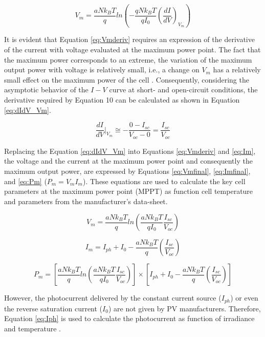 \begin{equation}
\label{eq:Vmderiv}
V_{m}=\dfrac{aNk_{B}T}{q} ln \left( -\dfrac{qNk_{B}T}{qI_{0}} \left( \dfrac{dI}{dV}  \right)_{V_{m}}   \right) 
\end{equation}

It is evident that Equation \ref{eq:Vmderiv} requires an expression of the derivative of the current with voltage evaluated at the maximum power point. The fact that the maximum power corresponds to an extreme, the variation of the maximum output power with voltage is relatively small, i.e., a change on $ V_{m} $ has a relatively small effect on the maximum power of the cell \cite{Saloux}. Consequently, considering the asymptotic behavior of the $I-V$ curve at short- and open-circuit conditions, the derivative required by Equation 10 can be calculated as shown in Equation \ref{eq:dIdV_Vm}.

\begin{equation}
\label{eq:dIdV_Vm}
\dfrac{dI}{dV}\vert_{V_{m}} \cong -\dfrac{0-I_{sc}}{V_{oc}-0}=\dfrac{I_{sc}}{V_{oc}}
\end{equation}

Replacing the Equation \ref{eq:dIdV_Vm} into Equations \ref{eq:Vmderiv} and \ref{eq:Im}, the voltage and the current at the maximum power point and consequently the maximum output power, are expressed by Equations \ref{eq:Vmfinal}, \ref{eq:Imfinal}, and \ref{eq:Pm} ($ P_{m}=V_{m}I_{m} $). These equations are used to calculate the key cell parameters at the maximum power point (MPPT) as function cell temperature and parameters from the manufacturer's data-sheet.

\begin{equation}
\label{eq:Vmfinal}
V_{m}=\dfrac{aNk_{B}T}{q} ln \left( \dfrac{aNk_{B}T}{qI_{0}} \dfrac{I_{sc}}{V_{oc}}  \right) 
\end{equation}

\begin{equation}
\label{eq:Imfinal}
I_{m} = I_{ph} + I_{0} - \dfrac{aNk_{B}T}{q} \left( \dfrac{I_{sc}}{V_{oc}} \right)  
\end{equation}

\begin{equation}
\label{eq:Pm}
P_{m} = \left[ \dfrac{aNk_{B}T}{q} ln \left( \dfrac{aNk_{B}T}{qI_{0}} \dfrac{I_{sc}}{V_{oc}}  \right) \right] \times \left[ I_{ph} + I_{0} - \dfrac{aNk_{B}T}{q} \left( \dfrac{I_{sc}}{V_{oc}} \right)  \right] 
\end{equation}


However, the photocurrent delivered by the constant current source ($ I_{ph} $) or even the reverse saturation current ($ I_{0} $) are not given by PV manufacturers. Therefore, Equation \ref{eq:Iph} is used to calculate the photocurrent as function of irradiance and temperature \cite{Villalva}.

